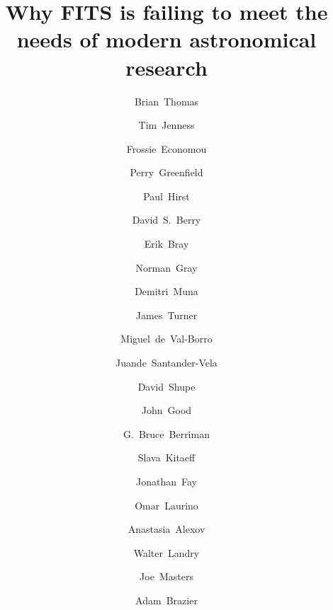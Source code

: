 \documentclass[final,authoryear,5p,times,twocolumn]{elsarticle}
\begin{document}
\begin{frontmatter}



\title{Why FITS is failing to meet the needs of modern astronomical research}


\author[noao]{Brian~Thomas}
\author[cornell]{Tim~Jenness}
\author[noao]{Frossie~Economou}
\author[stsci]{Perry~Greenfield}
\author[geminin]{Paul~Hirst}
\author[jac]{David~S.~Berry}
\author[stsci]{Erik~Bray}
\author[glasgow]{Norman~Gray}
\author[ohio]{Demitri~Muna}
\author[geminis]{James~Turner}
\author[princeton]{Miguel~de~Val-Borro}
\author[andalucia]{Juande~Santander-Vela}
\author[ipac]{David~Shupe}
\author[ipac]{John~Good}
\author[ipac]{G.~Bruce~Berriman}
\author[icrar]{Slava~Kitaeff}
\author[microsoft]{Jonathan~Fay}
\author[sao]{Omar~Laurino}
\author[stsci]{Anastasia~Alexov}
\author[ipac]{Walter~Landry}
\author[nrao]{Joe~Masters}
\author[cornell]{Adam~Brazier}



\end{frontmatter}
\end{document}
